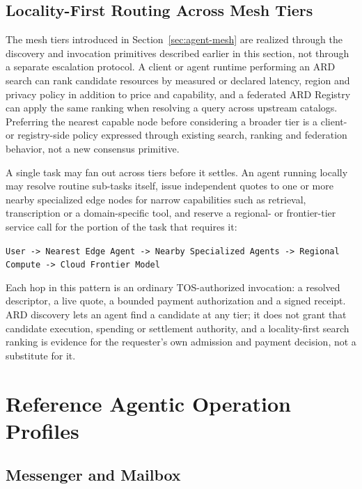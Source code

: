 \documentclass[11pt,oneside]{article}
\begin{document}
\subsection{Locality-First Routing Across Mesh Tiers}
\label{sec:mesh-routing}

The mesh tiers introduced in Section~\ref{sec:agent-mesh} are realized through the
discovery and invocation primitives described earlier in this section, not through a
separate escalation protocol. A client or agent runtime performing an ARD search can rank
candidate resources by measured or declared latency, region and privacy policy in addition
to price and capability, and a federated ARD Registry can apply the same ranking when
resolving a query across upstream catalogs. Preferring the nearest capable node before
considering a broader tier is a client- or registry-side policy expressed through existing
search, ranking and federation behavior, not a new consensus primitive.

A single task may fan out across tiers before it settles. An agent running locally may
resolve routine sub-tasks itself, issue independent quotes to one or more nearby specialized
edge nodes for narrow capabilities such as retrieval, transcription or a domain-specific
tool, and reserve a regional- or frontier-tier service call for the portion of the task that
requires it:

\begin{center}
\texttt{User -> Nearest Edge Agent -> Nearby Specialized Agents -> Regional Compute ->
Cloud Frontier Model}
\end{center}

Each hop in this pattern is an ordinary TOS-authorized invocation: a resolved descriptor, a
live quote, a bounded payment authorization and a signed receipt. ARD discovery lets an
agent find a candidate at any tier; it does not grant that candidate execution, spending or
settlement authority, and a locality-first search ranking is evidence for the requester's
own admission and payment decision, not a substitute for it.


\section{Reference Agentic Operation Profiles}
\label{sec:profiles}

\subsection{Messenger and Mailbox}
\end{document}
